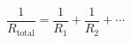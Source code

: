 \documentclass[12pt]{article}
\begin{document}
\[
\frac{1}{R_{\text{total}}} = \frac{1}{R_1} + \frac{1}{R_2} + \cdots
\]
\end{document}

